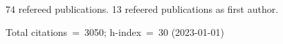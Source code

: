 74 refereed publications. 13 refeered publications as first author.

Total citations~=~3050; h-index~=~30 (2023-01-01)